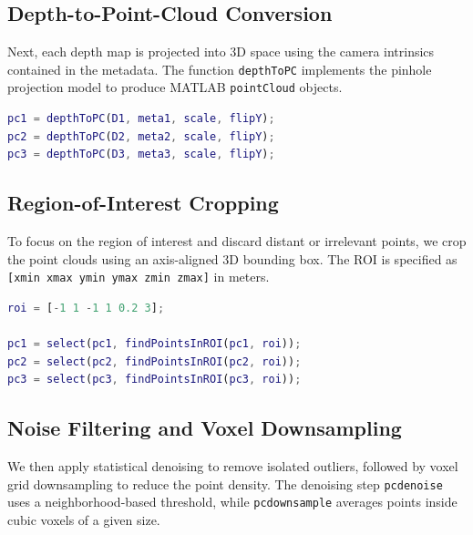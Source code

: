\documentclass[10pt]{article}
\begin{document}
\subsection{Depth-to-Point-Cloud Conversion}

Next, each depth map is projected into 3D space using the camera intrinsics
contained in the metadata. The function \verb|depthToPC| implements the
pinhole projection model to produce MATLAB \verb|pointCloud| objects.

\begin{lstlisting}[language=Matlab,caption={Converting depth images to 3D point clouds}]
% Convert depth maps to point clouds
pc1 = depthToPC(D1, meta1, scale, flipY);
pc2 = depthToPC(D2, meta2, scale, flipY);
pc3 = depthToPC(D3, meta3, scale, flipY);
\end{lstlisting}

\subsection{Region-of-Interest Cropping}

To focus on the region of interest and discard distant or irrelevant points,
we crop the point clouds using an axis-aligned 3D bounding box. The ROI is
specified as \verb|[xmin xmax ymin ymax zmin zmax]| in meters.

\begin{lstlisting}[language=Matlab,caption={Cropping point clouds to a 3D ROI}]
% ROI cropping: [xmin xmax ymin ymax zmin zmax]
roi = [-1 1 -1 1 0.2 3];

pc1 = select(pc1, findPointsInROI(pc1, roi));
pc2 = select(pc2, findPointsInROI(pc2, roi));
pc3 = select(pc3, findPointsInROI(pc3, roi));
\end{lstlisting}

\subsection{Noise Filtering and Voxel Downsampling}

We then apply statistical denoising to remove isolated outliers, followed by
voxel grid downsampling to reduce the point density. The denoising step
\verb|pcdenoise| uses a neighborhood-based threshold, while
\verb|pcdownsample| averages points inside cubic voxels of a given size.
\end{document}
